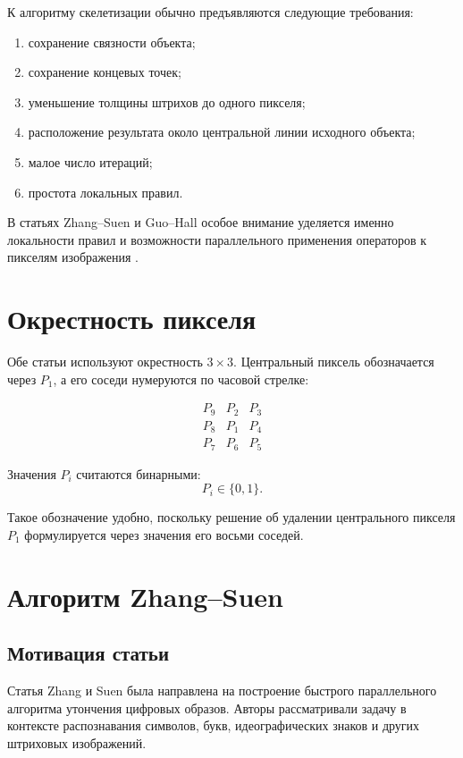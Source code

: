 \documentclass[12pt,a4paper]{article}
\begin{document}
	К алгоритму скелетизации обычно предъявляются следующие требования:
	
	\begin{enumerate}
		\item сохранение связности объекта;
		\item сохранение концевых точек;
		\item уменьшение толщины штрихов до одного пикселя;
		\item расположение результата около центральной линии исходного объекта;
		\item малое число итераций;
		\item простота локальных правил.
	\end{enumerate}
	
	В статьях Zhang--Suen и Guo--Hall особое внимание уделяется именно локальности правил и возможности параллельного применения операторов к пикселям изображения \cite{zhang1984,guo1989}.
	
	\section{Окрестность пикселя}
	
	Обе статьи используют окрестность $3\times3$. Центральный пиксель обозначается через $P_1$, а его соседи нумеруются по часовой стрелке:
	
	\[
	\begin{array}{ccc}
		P_9 & P_2 & P_3 \\
		P_8 & P_1 & P_4 \\
		P_7 & P_6 & P_5
	\end{array}
	\]
	
	Значения $P_i$ считаются бинарными:
	\[
	P_i \in \{0,1\}.
	\]
	
	Такое обозначение удобно, поскольку решение об удалении центрального пикселя $P_1$ формулируется через значения его восьми соседей.
	
	\section{Алгоритм Zhang--Suen}
	
	\subsection{Мотивация статьи}
	
	Статья Zhang и Suen \cite{zhang1984} была направлена на построение быстрого параллельного алгоритма утончения цифровых образов. Авторы рассматривали задачу в контексте распознавания символов, букв, идеографических знаков и других штриховых изображений.
	
\end{document}
